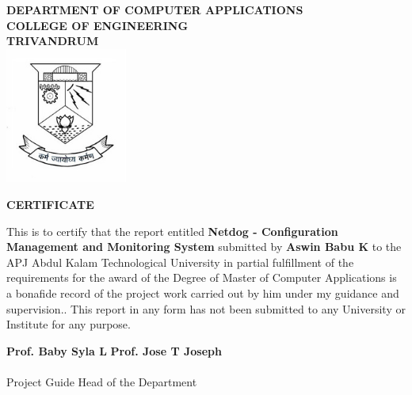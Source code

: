 \begin{titlepage}
\begin{center}

\textbf{DEPARTMENT OF COMPUTER APPLICATIONS}\\[0.5cm]
\textbf{ COLLEGE OF ENGINEERING \\ TRIVANDRUM}\\
[0.5cm]

\vspace{1.2cm}
\includegraphics[width=0.30\textwidth]{2.jpg}\\
\vspace{0.8cm}

\textbf{CERTIFICATE}\\
\end{center}

This is to certify that the report entitled 
\textbf{Netdog - Configuration Management and Monitoring System} submitted by
\textbf{Aswin Babu K} to the APJ Abdul Kalam Technological University in partial
fulfillment of the requirements for the award of the Degree of Master of
Computer Applications is a bonafide record of the project work carried out by
him under my guidance and supervision.. This report in any form has not been
submitted to any University or Institute for any purpose.

\vspace{1 cm}

\noindent\textbf{Prof. Baby Syla L}
\hfill \textbf{Prof. Jose T Joseph}
\\ \\
\noindent
Project Guide
\hfill Head of the Department

\end{titlepage}
